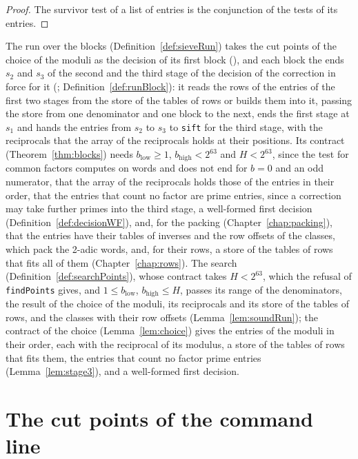 \begin{proof}
  \leanok
  The survivor test of a list of entries is the conjunction of the tests of its entries.
\end{proof}

The run over the blocks (Definition~\ref{def:sieveRun}) takes the cut points of the choice of the
moduli as the decision of its first block (), and each block the
ends $s_2$ and $s_3$ of the second and the third stage of the decision of the correction in force
for it (; Definition~\ref{def:runBlock}): it reads the rows of
the entries of the first two stages from the store of the tables of rows or builds them into it,
passing the store from one denominator and one block to the next, ends the first stage at $s_1$ and
hands the entries from $s_2$ to $s_3$ to \verb|sift| for the third stage, with the reciprocals that
the array of the reciprocals holds at their positions. Its contract (Theorem~\ref{thm:blocks})
needs $b_{\mathrm{low}} \ge 1$, $b_{\mathrm{high}} < 2^{63}$ and $H < 2^{63}$, since the test for
common factors computes on words and does not end for $b = 0$ and an odd numerator, that the array
of the reciprocals holds those of the entries in their order, that the entries that count no factor
are prime entries, since a correction may take further primes into the third stage, a well-formed
first decision (Definition~\ref{def:decisionWF}), and, for the packing (Chapter~\ref{chap:packing}),
that the entries have their tables of inverses and the row offsets of the classes, which pack the
2-adic words, and, for their rows, a store of the tables of rows that fits all of them
(Chapter~\ref{chap:rows}). The search (Definition~\ref{def:searchPoints}), whose contract takes
$H < 2^{63}$, which the refusal of \verb|findPoints| gives, and $1 \le b_{\mathrm{low}}$,
$b_{\mathrm{high}} \le H$, passes its range of the denominators, the result of the choice of the
moduli, its reciprocals and its store of the tables of rows, and the classes with their row offsets
(Lemma~\ref{lem:soundRun}); the contract of the choice (Lemma~\ref{lem:choice}) gives the entries of
the moduli in their order, each with the reciprocal of its modulus, a store of the tables of rows
that fits them, the entries that count no factor prime entries (Lemma~\ref{lem:stage3}), and a
well-formed first decision.

\section{The cut points of the command line}\label{sec:cuts}

